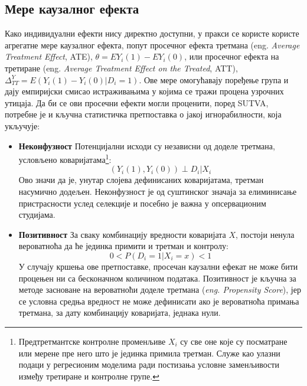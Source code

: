 \documentclass[12pt, a4paper]{article}
\begin{document}
\subsection{Мере каузалног ефекта}
Како индивидуални ефекти нису директно доступни, у пракси се користе користе агрегатне мере каузалног ефекта, попут просечног ефекта третмана 
(eng. \textit{Average Treatment Effect}, ATE), $\theta = E{Y_i(1)} - E{Y_i(0)}$, или просечног ефекта на третиране (eng. \textit{Average Treatment Effect on the Treated}, ATT), 
$\Delta^Y_{TT} = E{(Y_i(1) - Y_i(0) | D_i=1)}$. Ове мере омогућавају поређење група и дају емпиријски смисао истраживањима у којима се тражи процена узрочних утицаја. Да би 
се ови просечни ефекти могли проценити, поред SUTVA, потребне је и кључна статистичка претпоставка о јакој игнорабилности, која укључује:
\begin{itemize}
    \item \textbf{Неконфузност} Потенцијални исходи су независни од доделе третмана, условљено коваријатама\footnote{Предтретмантске контролне променљиве $X_i$ су све оне које су посматране или мерене 
пре него што је јединка примила третман. Служе као улазни подаци у регресионим моделима ради постизања условне заменљивости између третиране и контролне групе.}:
$$
(Y_i(1), Y_i(0)) \perp D_i | X_i
$$
Ово значи да је, унутар слојева дефинисаних коваријатама, третман насумично додељен. Неконфузност је од суштинског значаја за елиминисање пристрасности услед селекције и посебно је важна у опсервационим студијама.
    \item \textbf{Позитивност} За сваку комбинацију вредности коваријата $X$, постоји ненула вероватноћа да ће јединка примити и третман и контролу:
$$
0 < P(D_i=1|X_i=x) < 1
$$
У случају кршења ове претпоставке, просечан каузални ефекат не може бити процењен ни са бесконачном количином података. Позитивност је кључна за методе засноване на 
вероватноћи доделе третмана (\textit{eng. Propensity Score}), јер се условна средња вредност не може дефинисати ако је вероватноћа примања третмана, за дату комбинацију коваријата, једнака нули.
\end{itemize}
\end{document}
